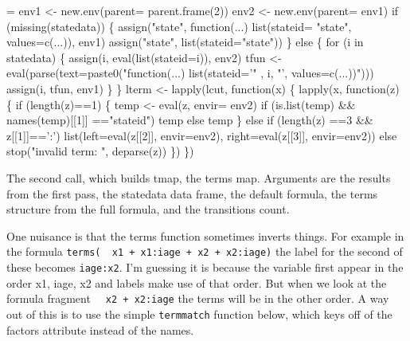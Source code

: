 \documentclass{article}
\newcommand{\code}[1]{\texttt{#1}}
\begin{document}
\begin{nwchunk}
=
 env1 <- new.env(parent= parent.frame(2))
 env2 <- new.env(parent= env1)
 if (missing(statedata)) \{
     assign("state", function(...) list(stateid= "state", 
                                        values=c(...)), env1)
     assign("state", list(stateid="state"))
 \}
 else \{
     for (i in statedata) \{
         assign(i, eval(list(stateid=i)), env2)
         tfun <- eval(parse(text=paste0("function(...) list(stateid='"
                                        , i, "', values=c(...))")))
         assign(i, tfun, env1)
     \}
 \}
 lterm <- lapply(lcut, function(x) \{
     lapply(x, function(z) \{
         if (length(z)==1) \{
             temp <- eval(z, envir= env2)
             if (is.list(temp) && names(temp)[[1]] =="stateid") temp
             else temp
         \}
         else if (length(z) ==3 && z[[1]]==':')
             list(left=eval(z[[2]], envir=env2), right=eval(z[[3]], envir=env2))
         else stop("invalid term: ", deparse(z))
     \})
 \})
\end{nwchunk}


The second call, which builds tmap, the terms map.
Arguments are the results from the first pass, the statedata data frame,
the default formula, the terms structure from the full formula,
and the transitions count.

One nuisance is that the terms function sometimes inverts things.  For 
example in the formula
\code{terms(~ x1 + x1:iage + x2 + x2:iage)} the label for the second
of these becomes \code{iage:x2}.  
I'm guessing it is because the variable first appear in the order x1, iage, x2
and labels make use of that order. 
But when we look at the formula fragment \code{~ x2 + x2:iage} the terms
will be in the other order.  
A way out of this is to use the simple \code{termmatch} function below,
which keys off of the factors attribute instead of the names. 
\end{document}
